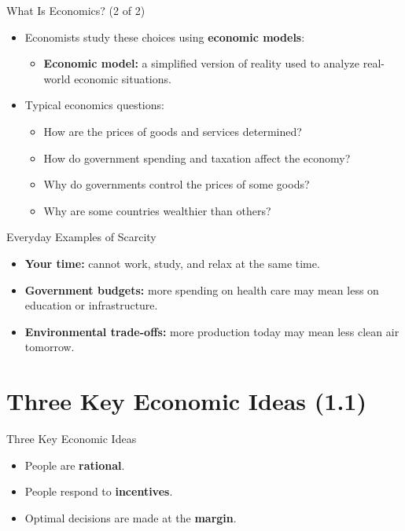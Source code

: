 \documentclass[aspectratio=169]{beamer}
\begin{document}
\begin{frame}{What Is Economics? (2 of 2)}
\transfade
\begin{itemize}
  \item Economists study these choices using \textbf{economic models}:
  \begin{itemize}
    \item \textbf{Economic model:} a simplified version of reality used to analyze real-world economic situations.
  \end{itemize}
  \item Typical economics questions:
  \begin{itemize}
    \item How are the prices of goods and services determined?
    \item How do government spending and taxation affect the economy?
    \item Why do governments control the prices of some goods?
    \item Why are some countries wealthier than others?
  \end{itemize}
\end{itemize}
\end{frame}

\begin{frame}{Everyday Examples of Scarcity}
\transfade
\begin{itemize}
  \item \textbf{Your time:} cannot work, study, and relax at the same time.
  \item \textbf{Government budgets:} more spending on health care may mean less on education or infrastructure.
  \item \textbf{Environmental trade-offs:} more production today may mean less clean air tomorrow.
\end{itemize}
\end{frame}



\section{Three Key Economic Ideas (1.1)}

\begin{frame}{Three Key Economic Ideas}
\transfade
\begin{itemize}
  \item People are \textbf{rational}.
  \item People respond to \textbf{incentives}.
  \item Optimal decisions are made at the \textbf{margin}.
\end{itemize}
\end{frame}
\end{document}
